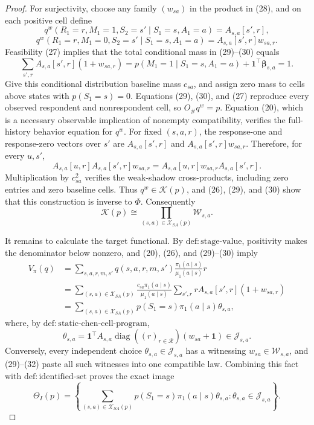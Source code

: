 \documentclass{article}
\begin{document}
\begin{proof}
For surjectivity, choose any family \((w_{sa})\) in the product in (28), and on each positive cell define
\[
 q^w(R_1=r,M_1=1,S_2=s'\mid S_1=s,A_1=a)=A_{s,a}[s',r],
\tag{29}
\]
\[
 q^w(R_1=r,M_1=0,S_2=s'\mid S_1=s,A_1=a)=A_{s,a}[s',r]w_{sa,r}.
\tag{30}
\]
Feasibility (27) implies that the total conditional mass in (29)--(30) equals
\[
 \sum_{s',r}A_{s,a}[s',r](1+w_{sa,r})
 =p(M_1=1\mid S_1=s,A_1=a)+\mathbf 1^\top\boldsymbol\beta_{s,a}=1.
\tag{31}
\]
Give this conditional distribution baseline mass \(c_{sa}\), and assign zero mass to cells above states with \(p(S_1=s)=0\).  Equations (29), (30), and (27) reproduce every observed respondent and nonrespondent cell, so \(O_\#q^w=p\).  Equation (20), which is a necessary observable implication of nonempty compatibility, verifies the full-history behavior equation for \(q^w\).  For fixed \((s,a,r)\), the response-one and response-zero vectors over \(s'\) are \(A_{s,a}[s',r]\) and \(A_{s,a}[s',r]w_{sa,r}\).  Therefore, for every \(u,s'\),
\[
 A_{s,a}[u,r]A_{s,a}[s',r]w_{sa,r}
 =A_{s,a}[u,r]w_{sa,r}A_{s,a}[s',r].
\tag{32}
\]
Multiplication by \(c_{sa}^2\) verifies the weak-shadow cross-products, including zero entries and zero baseline cells.  Thus \(q^w\in\mathcal K(p)\), and (26), (29), and (30) show that this construction is inverse to \(\Phi\).  Consequently
\[
 \mathcal K(p)\cong
 \prod_{(s,a)\in\mathcal X_{SA}(p)}\mathcal W_{s,a}.
\tag{33}
\]

It remains to calculate the target functional.  By \(\mathrm{def{:}stage\text{-}value}\), positivity makes the denominator below nonzero, and (20), (26), and (29)--(30) imply
\[
\begin{aligned}
 V_\pi(q)
 &=\sum_{s,a,r,m,s'}q(s,a,r,m,s')
   \frac{\pi_1(a\mid s)}{\mu_1(a\mid s)}r\\
 &=\sum_{(s,a)\in\mathcal X_{SA}(p)}
   \frac{c_{sa}\pi_1(a\mid s)}{\mu_1(a\mid s)}
   \sum_{s',r}rA_{s,a}[s',r](1+w_{sa,r})\\
 &=\sum_{(s,a)\in\mathcal X_{SA}(p)}
   p(S_1=s)\pi_1(a\mid s)\theta_{s,a},
\end{aligned}
\tag{34}
\]
where, by \(\mathrm{def{:}static\text{-}chen\text{-}cell\text{-}program}\),
\[
 \theta_{s,a}=\mathbf 1^\top A_{s,a}
 \operatorname{diag}((r)_{r\in\mathcal R})(w_{sa}+\mathbf 1)
 \in\mathcal J_{s,a}.
\tag{35}
\]
Conversely, every independent choice \(\theta_{s,a}\in\mathcal J_{s,a}\) has a witnessing \(w_{sa}\in\mathcal W_{s,a}\), and (29)--(32) paste all such witnesses into one compatible law.  Combining this fact with \(\mathrm{def{:}identified\text{-}set}\) proves the exact image
\[
 \Theta_I(p)=\left\{
 \sum_{(s,a)\in\mathcal X_{SA}(p)}p(S_1=s)\pi_1(a\mid s)\theta_{s,a}:
 \theta_{s,a}\in\mathcal J_{s,a}
 \right\}.
\tag{36}
\]


\end{proof}
\end{document}
